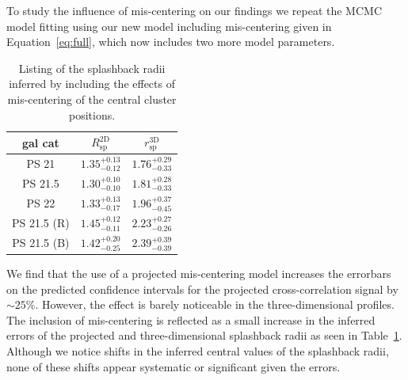 \documentclass[iop, apjl, twocolappendix, numberedappendix]{emulateapj}
\begin{document}
To study the influence of mis-centering on our findings we repeat the
MCMC model fitting using our new model including mis-centering given
in Equation~\ref{eq:full}, which now includes two more model
parameters. 
\begin{table}
    \centering
    \caption{Listing of the splashback radii inferred by including the effects of mis-centering of the central cluster positions. }
    \label{tab:mis_splash}
    \begin{tabular}{ccc}
    \hline 
gal cat &  $R_{\mathrm{sp}}^{\mathrm{2D}}$ & $r_{\mathrm{sp}}^{\mathrm{3D}}$ \\
\hline 
\hline 
PS 21 &$1.35_{-0.12}^{+0.13}$ & $1.76_{-0.33}^{+0.29}$\\
\hline
PS 21.5 & $1.30_{-0.10}^{+0.10}$&$1.81_{-0.33}^{+0.28}$\\
\hline
PS 22 &$1.33_{-0.17}^{+0.13}$ & $1.96_{-0.45}^{+0.37}$\\
\hline
PS 21.5 (R) & $1.45_{-0.11}^{+0.12}$ & $2.23_{-0.26}^{+0.27}$ \\
\hline
PS 21.5 (B) & $1.42_{-0.25}^{+0.20}$ & $2.39_{-0.39}^{+0.39}$ \\
\hline
    \end{tabular} 
\end{table}

We find that the use of a projected mis-centering model increases the
errorbars on the predicted confidence intervals for the projected
cross-correlation signal by $\sim 25$\%. However, the effect is barely
noticeable in the three-dimensional profiles.  The inclusion of
mis-centering is reflected as a small increase in the inferred errors
of the projected and three-dimensional splashback radii as seen in
Table~\ref{tab:mis_splash}. Although we notice shifts in the inferred
central values of the splashback radii, none of these shifts appear
systematic or significant given the errors.
\end{document}
